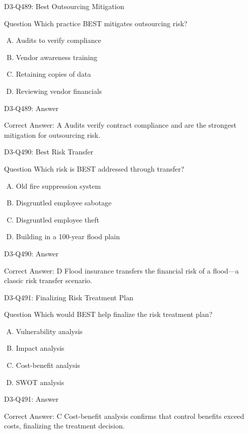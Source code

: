 \documentclass{beamer}
\begin{document}
\begin{frame}{D3-Q489: Best Outsourcing Mitigation}
	\begin{block}{Question}
		Which practice BEST mitigates outsourcing risk?
	\end{block}
	\begin{enumerate}[(A)]
		\item Audits to verify compliance
		\item Vendor awareness training
		\item Retaining copies of data
		\item Reviewing vendor financials
	\end{enumerate}
\end{frame}
\begin{frame}{D3-Q489: Answer}
	\begin{block}{Correct Answer: A}
		Audits verify contract compliance and are the strongest mitigation for outsourcing risk.
	\end{block}
\end{frame}

\begin{frame}{D3-Q490: Best Risk Transfer}
	\begin{block}{Question}
		Which risk is BEST addressed through transfer?
	\end{block}
	\begin{enumerate}[(A)]
		\item Old fire suppression system
		\item Disgruntled employee sabotage
		\item Disgruntled employee theft
		\item Building in a 100-year flood plain
	\end{enumerate}
\end{frame}
\begin{frame}{D3-Q490: Answer}
	\begin{block}{Correct Answer: D}
		Flood insurance transfers the financial risk of a flood—a classic risk transfer scenario.
	\end{block}
\end{frame}

\begin{frame}{D3-Q491: Finalizing Risk Treatment Plan}
	\begin{block}{Question}
		Which would BEST help finalize the risk treatment plan?
	\end{block}
	\begin{enumerate}[(A)]
		\item Vulnerability analysis
		\item Impact analysis
		\item Cost-benefit analysis
		\item SWOT analysis
	\end{enumerate}
\end{frame}
\begin{frame}{D3-Q491: Answer}
	\begin{block}{Correct Answer: C}
		Cost-benefit analysis confirms that control benefits exceed costs, finalizing the treatment decision.
	\end{block}
\end{frame}
\end{document}
